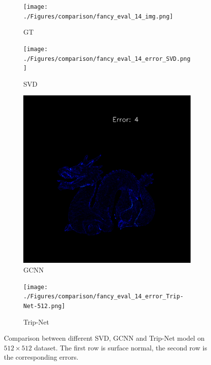 \documentclass[border=15pt, multi, tikz]{article}
\begin{document}
\begin{figure}[H]
	
	\begin{subfigure}[b]{0.24\linewidth}
		\texttt{[image: ./Figures/comparison/fancy\_eval\_14\_img.png]}
		\caption{GT}
	\end{subfigure}
	\begin{subfigure}[b]{0.24\linewidth}
		\texttt{[image: ./Figures/comparison/fancy\_eval\_14\_error\_SVD.png]}
		\caption{SVD}
	\end{subfigure}
	\begin{subfigure}[b]{0.24\linewidth}
		\includegraphics[width=\linewidth]{./Figures/comparison/fancy_eval_14_error_GCNN-512-269.png}
		\caption{GCNN}
	\end{subfigure}
	\begin{subfigure}[b]{0.24\linewidth}
		\texttt{[image: ./Figures/comparison/fancy\_eval\_14\_error\_Trip-Net-512.png]}
		\caption{Trip-Net}
	\end{subfigure}
	
	
	
	\caption{Comparison between different SVD, GCNN and Trip-Net model on $ 512\times 512 $ dataset. The first row is surface normal, the second row is the corresponding errors. }
	\label{fig:high_resolution_eval}
\end{figure}
\end{document}
